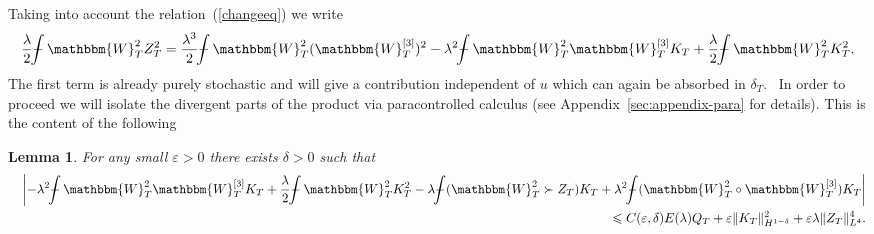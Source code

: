 \documentclass[11pt, oneside]{article}   	%
\newtheorem{lemma}{Lemma}
\def\Xint#1{\mathchoice
{\XXint\displaystyle\textstyle{#1}}%
{\XXint\textstyle\scriptstyle{#1}}%
{\XXint\scriptstyle\scriptscriptstyle{#1}}%
{\XXint\scriptscriptstyle\scriptscriptstyle{#1}}%
\!\int}
\def\XXint#1#2#3{{\setbox0=\hbox{$#1{#2#3}{\int}$ }
\vcenter{\hbox{$#2#3$ }}\kern-.6\wd0}}
\def\dashint{\Xint-}
\newcommand{\bint}{\dashint}
\begin{document}
Taking into account the relation~(\ref{changeeq}) we write
\[ \frac{\lambda}{2} \bint \mathbbm{W}^2_T Z_T^2 = \frac{\lambda^3}{2} \bint
   \mathbbm{W}^2_T (\mathbbm{W}_T^{[3]})^2 - \lambda^2 \bint \mathbbm{W}^2_T
   \mathbbm{W}_T^{[3]} K_T + \frac{\lambda}{2} \bint \mathbbm{W}^2_T K_T^2 .
\]
The first term is already purely stochastic and will give a contribution
independent of $u$ which can again be absorbed in $\delta_T$. \ In order to
proceed we will isolate the divergent parts of the product via paracontrolled
calculus (see Appendix~\ref{sec:appendix-para} for details). This is the
content of the following

\begin{lemma}
  For any small $\varepsilon > 0$ there exists $\delta > 0$ such that
  \begin{eqnarray*}
    &  & \left| - \lambda^2 \bint \mathbbm{W}^2_T \mathbbm{W}_T^{[3]} K_T +
    \frac{\lambda}{2} \bint \mathbbm{W}^2_T K_T^2 - \lambda \bint
    (\mathbbm{W}^2_T \succ Z_T) K_T + \lambda^2 \bint (\mathbbm{W}^2_T \circ
    \mathbbm{W}_T^{[3]}) K_T \right|\\
    &  & \leqslant C (\varepsilon, \delta) E (\lambda) Q_T + \varepsilon \|
    K_T \|^2_{H^{1 - \delta}} + \varepsilon \lambda \| Z_T \|^4_{L^4} .
  \end{eqnarray*}
\end{lemma}
\end{document}
